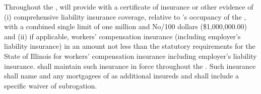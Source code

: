 Throughout the \termOfLease, \lessee will provide \lessor with a certificate of insurance or other evidence of (i) comprehensive liability insurance coverage, relative to \lessee's occupancy of the \premises, with a combined single limit of one million and No/100 dollars (\$1,000,000.00) and (ii) if applicable, workers' compensation insurance (including employer's liability insurance) in an amount not less than the statutory requirements for the State of Illinois for workers' compensation insurance including employer's liability insurance. \lessee shall maintain such insurance in force throughout the \termOfLease. Such insurance shall name \lessor and any mortgagees of \lessor as additional insureds and shall include a specific waiver of subrogation.
